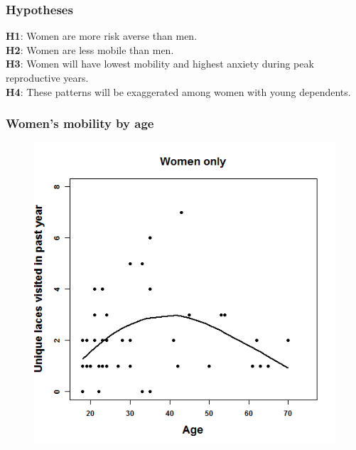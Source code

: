 \documentclass{beamer}
\begin{document}

\begin{frame}

\frametitle{Hypotheses}

\textbf{H1}: Women are more risk averse than men. \\
\vspace{0.75cm}
\textbf{H2}: Women are less mobile than men. \\
\vspace{0.75cm}
\textbf{H3}: Women will have lowest mobility and highest anxiety during peak reproductive years. \\
\vspace{0.75cm}
\textbf{H4}: These patterns will be exaggerated among women with young dependents. \\

\end{frame}


\begin{frame}
\frametitle{Women's mobility by age}
\begin{figure}
\includegraphics[width=0.65\linewidth]{justwom}
\end{figure}
\end{frame}

\end{document}
